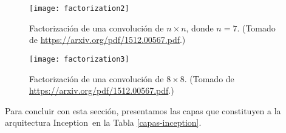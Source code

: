 \begin{figure}[H]
  \centering
  \texttt{[image: factorization2]}
  \caption{Factorización de una convolución de $n \times n$, donde $n = 7$.
    (Tomado de \url{https://arxiv.org/pdf/1512.00567.pdf}.)}
  \label{factorization2}
\end{figure}

\begin{figure}[H]
  \centering
  \texttt{[image: factorization3]}
  \caption{Factorización de una convolución de $8 \times 8$.
    (Tomado de \url{https://arxiv.org/pdf/1512.00567.pdf}.)}
  \label{factorization3}
\end{figure}

Para concluir con esta sección, presentamos las capas que constituyen a la arquitectura Inception\
en la Tabla \ref{capas-inception}.

\noindent
\begin{table}[H]
  \caption{
    Las capas que conforman a la arquitectura convolucional \emph{Inception V3}.
    Normalmente, la dimensión de la última capa se modifica dependiendo de la tarea de clasificación
    deseada. (Tomado de \url{https://arxiv.org/pdf/1512.00567.pdf}.)
  }
  \label{capas-inception}
\end{table}

